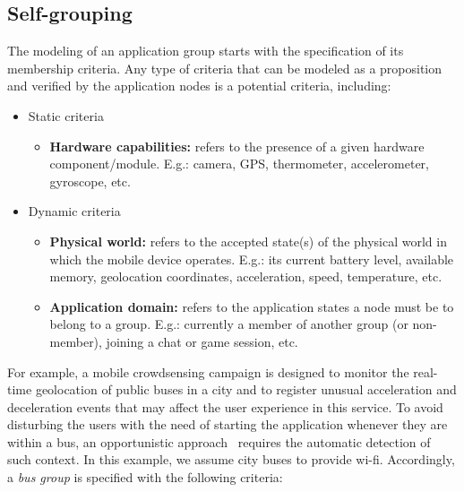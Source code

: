  
\subsection{Self-grouping} 
 
The modeling of an application group starts with the specification of its membership criteria. Any type of criteria that can be modeled as a proposition and verified by the application nodes is a potential criteria, including:

\begin{itemize}

\item Static criteria

\begin{itemize}

\item \textbf{Hardware capabilities:} refers to the presence of a given hardware component/module. E.g.: camera, GPS, thermometer, accelerometer, gyroscope, etc.

\end{itemize}

\item Dynamic criteria

\begin{itemize}

\item \textbf{Physical world:} refers to the accepted state(s) of the physical world in which the mobile device operates. E.g.: its current battery level, available memory, geolocation coordinates, acceleration, speed, temperature, etc.

\item \textbf{Application domain:} refers to the application states a node must be to belong to a group. E.g.: currently a member of another group (or non-member), joining a chat or game session, etc.

\end{itemize}

\end{itemize}


For example, a mobile crowdsensing campaign is designed to monitor the real-time geolocation of public buses in a city and to register unusual acceleration and deceleration events that may affect the user experience in this service. To avoid disturbing the users with the need of starting the application whenever they are within a bus, an opportunistic approach~\cite{} requires the automatic detection of such context. In this example, we assume city buses to provide wi-fi. Accordingly, a \textit{bus group} is specified with the following criteria:

